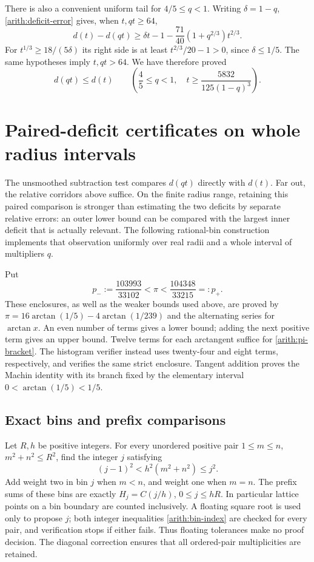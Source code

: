 \documentclass[11pt,reqno]{amsart}
\numberwithin{equation}{section}
\begin{document}
There is also a convenient uniform tail for $4/5\le q<1$.
Writing $\delta=1-q$, \eqref{arith:deficit-error} gives, when
$t,qt\ge64$,
\[
 d(t)-d(qt)\ge\delta t-1-
       \frac{71}{40}(1+q^{2/3})t^{2/3}.
\]
For $t^{1/3}\ge18/(5\delta)$ its right side is at least
$t^{2/3}/20-1>0$, since $\delta\le1/5$.  The same hypotheses imply
$t,qt>64$.  We have therefore proved
\begin{equation}\label{arith:subtraction-tail}
 d(qt)\le d(t)\qquad
 \left(\frac45\le q<1,\quad
       t\ge\frac{5832}{125(1-q)^3}\right).
\end{equation}

\section{Paired-deficit certificates on whole radius intervals}
\label{arith:paired}

The unsmoothed subtraction test compares $d(qt)$ directly with $d(t)$.
Far out, the relative corridors above suffice.  On the finite radius
range, retaining this paired comparison is stronger than estimating
the two deficits by separate relative errors: an outer lower bound can
be compared with the largest inner deficit that is actually relevant.
The following rational-bin construction implements that observation
uniformly over real radii and a whole interval of multipliers $q$.

Put
\begin{equation}\label{arith:pi-bracket}
 p_-:=\frac{103993}{33102}<\pi<
       \frac{104348}{33215}=:p_+.
\end{equation}
These enclosures, as well as the weaker bounds used above, are proved
by $\pi=16\arctan(1/5)-4\arctan(1/239)$ and the alternating series
for $\arctan x$.  An even number of terms gives a lower bound; adding
the next positive term gives an upper bound.  Twelve terms for each
arctangent suffice for \eqref{arith:pi-bracket}.  The histogram verifier
instead uses twenty-four and eight terms, respectively, and verifies
the same strict enclosure.  Tangent addition proves the Machin identity
with its branch fixed by the elementary interval $0<\arctan(1/5)<1/5$.

\subsection{Exact bins and prefix comparisons}

Let $R,h$ be positive integers.  For every unordered positive pair
$1\le m\le n$, $m^2+n^2\le R^2$, find the integer $j$ satisfying
\begin{equation}\label{arith:bin-index}
 (j-1)^2<h^2(m^2+n^2)\le j^2.
\end{equation}
Add weight two in bin $j$ when $m<n$, and weight one when $m=n$.
The prefix sums of these bins are exactly
$H_j=C(j/h)$, $0\le j\le hR$.  In particular lattice points on a
bin boundary are counted inclusively.  A floating square root is used
only to propose $j$; both integer inequalities
\eqref{arith:bin-index} are checked for every pair, and verification
stops if either fails.  Thus floating tolerances make no proof decision.
The diagonal correction ensures that all ordered-pair multiplicities
are retained.
\end{document}
